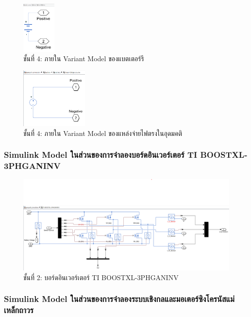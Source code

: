 \documentclass[11pt,a4paper]{article}
\begin{document}
\begin{figure}[H]
    \centering
    \includegraphics[width=0.15\textwidth]{layer2-1-layer0-1.png}
    \caption{ชั้นที่ 4: ภายใน Variant Model ของแบตเตอร์รี}
\end{figure}

\begin{figure}[H]
    \centering
    \includegraphics[width=0.3\textwidth]{layer2-1-layer0-2.png}
    \caption{ชั้นที่ 4: ภายใน Variant Model ของแหล่งจ่ายไฟตรงในอุดมคติ}
\end{figure}

\subsubsection{Simulink Model ในส่วนของการจำลองบอร์ดอินเวอร์เตอร์ TI BOOSTXL-3PHGANINV}

\begin{figure}[H]
    \centering
    \includegraphics[width=\textwidth]{l1-inverter.png}
    \caption{ชั้นที่ 2: บอร์ดอินเวอร์เตอร์ TI BOOSTXL-3PHGANINV}
\end{figure}

\subsubsection{Simulink Model ในส่วนของการจำลองระบบเชิงกลและมอเตอร์ซิงโครนัสแม่เหล็กถาวร}
\end{document}
